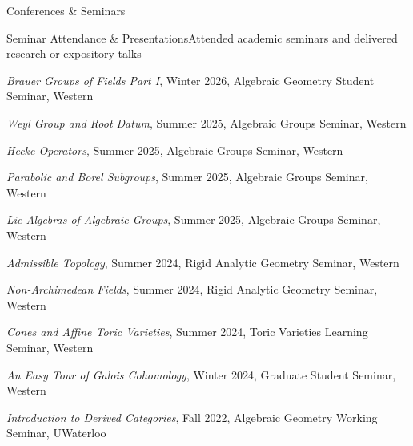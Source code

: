 \documentclass{resume}
\begin{document}
\begin{rSection}{Conferences \& Seminars}
\begin{rSubsection}{Seminar Attendance \& Presentations}{}{Attended academic seminars and delivered research or expository talks}{}
    \item {\em Brauer Groups of Fields Part I}, Winter 2026, Algebraic Geometry Student Seminar, Western
    \item {\em Weyl Group and Root Datum}, Summer 2025, Algebraic Groups Seminar, Western
    \item {\em Hecke Operators}, Summer 2025, Algebraic Groups Seminar, Western
    \item {\em Parabolic and Borel Subgroups}, Summer 2025, Algebraic Groups Seminar, Western
    \item {\em Lie Algebras of Algebraic Groups}, Summer 2025, Algebraic Groups Seminar, Western
    \item {\em Admissible Topology}, Summer 2024, Rigid Analytic Geometry Seminar, Western
    \item {\em Non-Archimedean Fields}, Summer 2024, Rigid Analytic Geometry Seminar, Western
    \item {\em Cones and Affine Toric Varieties}, Summer 2024, Toric Varieties Learning Seminar, Western
    \item {\em An Easy Tour of Galois Cohomology}, Winter 2024, Graduate Student Seminar, Western
    \item {\em Introduction to Derived Categories}, Fall 2022, Algebraic Geometry Working Seminar, UWaterloo
\end{rSubsection}

\end{rSection}
\vspace{0.25em}
\end{document}
